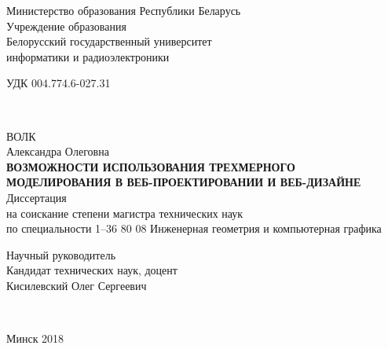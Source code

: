 \begin{titlepage}
  \begin{center}
    Министерство образования Республики Беларусь\\
    Учреждение образования\\
    Белорусский государственный университет \\
    информатики и радиоэлектроники\\[3.2em]

    \begin{flushleft}
      \begin{minipage}{0.4\textwidth}
         УДК 004.774.6-027.31
      \end{minipage}\\[3.2em]
    \end{flushleft}

    \MakeUppercase{Волк} \\
    Александра Олеговна \\[5em]


    \MakeUppercase{\textbf{Возможности использования трехмерного моделирования в веб-проектировании и веб-дизайне}}\\[1em]

    Диссертация \\
    на соискание степени магистра технических наук \\
    по специальности 1–36 80 08 Инженерная геометрия и компьютерная графика \\[5em]

    \begin{flushright}
      \begin{minipage}{0.5\textwidth}
        Научный руководитель\\
        Кандидат технических наук, доцент\\
        Кисилевский Олег Сергеевич
      \end{minipage}\\[3.2em]
    \end{flushright}

    \vfill
    {\normalsize Минск 2018}

  \end{center}

\end{titlepage}
